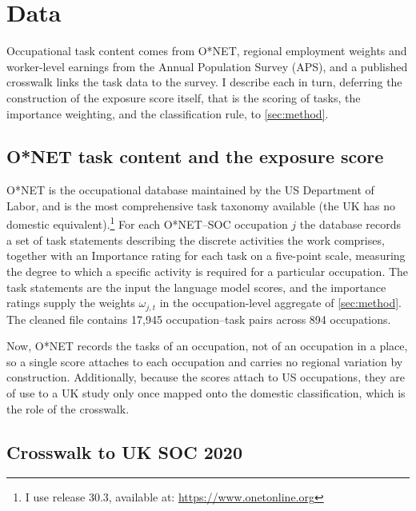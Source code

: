 \section{Data}\label{sec:data}

Occupational task content comes from O*NET, regional employment weights and worker-level earnings from the Annual Population Survey (APS), and a published crosswalk links the task data to the survey. I describe each in turn, deferring the construction of the exposure score itself, that is the scoring of tasks, the importance weighting, and the classification rule, to \cref{sec:method}.

\subsection{O*NET task content and the exposure score}\label{sec:onet}

O*NET is the occupational database maintained by the US Department of Labor, and is the most comprehensive task taxonomy available (the UK has no domestic equivalent).\footnote{I use release 30.3, available at: \url{https://www.onetonline.org}} For each O*NET--SOC occupation $j$ the database records a set of task statements describing the discrete activities the work comprises, together with an Importance rating for each task on a five-point scale, measuring the degree to which a specific activity is required for a particular occupation. The task statements are the input the language model scores, and the importance ratings supply the weights $\omega_{j,t}$ in the occupation-level aggregate of \cref{sec:method}. The cleaned file contains 17,945 occupation--task pairs across 894 occupations.

Now, O*NET records the tasks of an occupation, not of an occupation in a place, so a single score attaches to each occupation and carries no regional variation by construction. Additionally, because the scores attach to US occupations, they are of use to a UK study only once mapped onto the domestic classification, which is the role of the crosswalk. 


\subsection{Crosswalk to UK SOC 2020}\label{sec:crosswalk}


